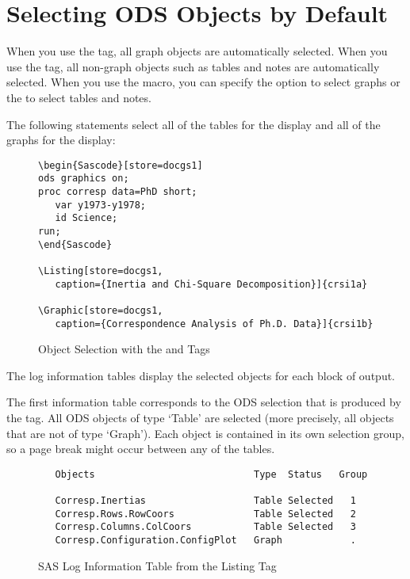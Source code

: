 \documentclass[article,oneside]{memoir}
\begin{document}
\section{Selecting ODS Objects by Default}\label{odsdefault}
  
  When you use the  tag, all graph objects are automatically selected.
  When you use the  tag, all non-graph objects such as tables and notes
  are automatically selected.  When you use the  macro, you can specify 
  the  option to select graphs or the  to
  select tables and notes.
  
  The following statements select all of the tables for the  
  display and all of the graphs for the  display:

\begin{figure}[H]
\begin{snugshade}
\begin{verbatim}
\begin{Sascode}[store=docgs1]
ods graphics on;
proc corresp data=PhD short;
   var y1973-y1978;
   id Science;
run;
\end{Sascode}
 
\Listing[store=docgs1,
   caption={Inertia and Chi-Square Decomposition}]{crsi1a}
   
\Graphic[store=docgs1, 
   caption={Correspondence Analysis of Ph.D. Data}]{crsi1b}
\end{verbatim}
\end{snugshade}
\caption{Object Selection with the  and  Tags}\label{optionoption}
\end{figure}
  
  The log information tables display the selected objects for each 
  block of output.
  
  The first information table corresponds to the ODS selection that is produced 
  by the  tag. All ODS objects of type `Table' are 
  selected (more precisely, all objects that are not of type `Graph'). 
  Each object is contained in its own selection group, so
  a page break might occur between any of the tables.
  
\begin{figure}[H]
\begin{snugshade}
\begin{verbatim}
   Objects                            Type  Status   Group
 
   Corresp.Inertias                   Table Selected   1
   Corresp.Rows.RowCoors              Table Selected   2
   Corresp.Columns.ColCoors           Table Selected   3
   Corresp.Configuration.ConfigPlot   Graph            .
\end{verbatim}
\end{snugshade}
\caption{SAS Log Information Table from the Listing Tag}\label{loglstinfo}
\end{figure}
\end{document}
